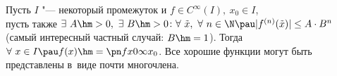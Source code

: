 
    Пусть $I$ "--- некоторый промежуток и $f\in C^\infty(I),\ x_0\in I$,\\ пусть также $\exists\  A\hm>0,\ \exists\  B\hm>0\colon \forall\  \tilde x,\ \forall\  n\in\N
    \pau|f^{(n)}(\tilde x)|\leq A\cdot B^n$ (самый интересный частный случай: $B\hm=1$). Тогда $\forall\  x\in I\pau
    f(x)\hm=\pn fx0{\infty}{x_0}$. Все хорошие функции могут быть представлены в~виде почти многочлена.
